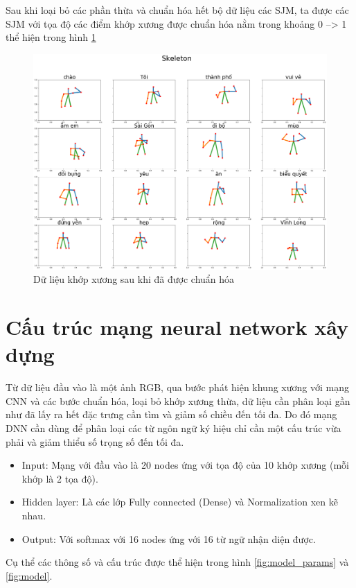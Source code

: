 Sau khi loại bỏ các phần thừa và chuẩn hóa hết bộ dữ liệu các SJM, ta được các SJM với tọa độ các điểm khớp xương được chuẩn hóa nằm trong khoảng 0 --> 1 thể hiện trong hình \ref{fig:skeleton_normalize}
\FloatBarrier
\begin{figure}[htp]
\begin{center}
\includegraphics[scale=0.25]{chap4/c4_figs/datajoint.png}
\end{center}
\caption{Dữ liệu khớp xương sau khi đã được chuẩn hóa}
\label{fig:skeleton_normalize}
\end{figure}
\FloatBarrier

\section{Cấu trúc mạng neural network xây dựng}
Từ dữ liệu đầu vào là một ảnh RGB, qua bước phát hiện khung xương với mạng CNN và các bước chuẩn hóa, loại bỏ khớp xương thừa, dữ liệu cần phân loại gần như đã lấy ra hết đặc trưng cần tìm và giảm số chiều đến tối đa. Do đó mạng DNN cần dùng để phân loại các từ ngôn ngữ ký hiệu chỉ cần một cấu trúc vừa phải và giảm thiểu số trọng số đến tối đa.
\begin{itemize}
\item Input: Mạng với đầu vào là 20 nodes ứng với tọa độ của 10 khớp xương (mỗi khớp là 2 tọa độ).
\item Hidden layer: Là các lớp Fully connected (Dense) và Normalization xen kẽ nhau.
\item Output: Với softmax với 16 nodes ứng với 16 từ ngữ nhận diện được.
\end{itemize}
Cụ thể các thông số và cấu trúc được thể hiện trong hình \ref{fig:model_params} và \ref{fig:model}.

